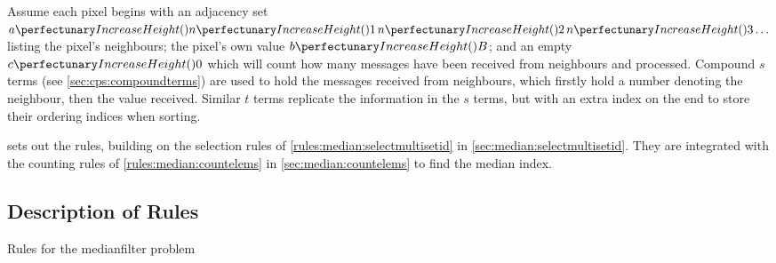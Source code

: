 Assume each pixel begins with an adjacency set \(\cpfunc{a}{\cpfunc{n}{1} \, \cpfunc{n}{2} \, \cpfunc{n}{3} \ldots}\) listing the pixel's neighbours; the pixel's own value \(\cpfunc{b}{B}\); and an empty \(\cpfunc{c}{0}\) which will count how many messages have been received from neighbours and processed.   Compound \(s\) terms (see \vref{sec:cps:compoundterms}) are used to hold the messages received from neighbours, which firstly hold a number denoting the neighbour, then the value received. Similar \(t\) terms replicate the information in the \(s\) terms, but with an extra index on the end to store their ordering indices when sorting.

 sets out the rules, building on the selection rules of \vref{rules:median:selectmultisetid} in \cref{sec:median:selectmultisetid}.  They are integrated with the counting rules of \vref{rules:median:countelems} in \cref{sec:median:countelems} to find the median index.

\subsection{Description of Rules}

\begin{cprulesetfloat}
\begin{cpruleset}
%
%
%
%

%
\end{cpruleset}
\caption{\label{ruleset:medianfilter}Rules for the \gls{medianfilter} problem}
\end{cprulesetfloat}

